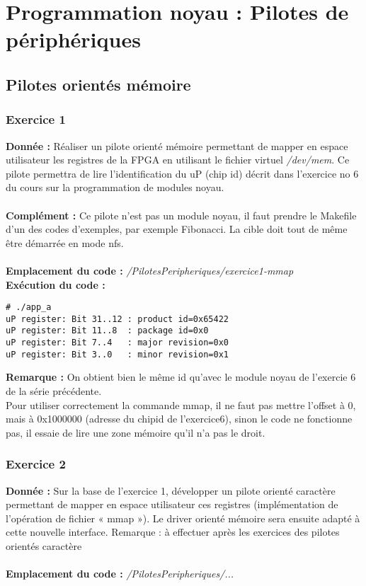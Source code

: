 \section{Programmation noyau : Pilotes de périphériques}
\subsection{Pilotes orientés mémoire}
\subsubsection{Exercice 1}
\textbf{Donnée : } Réaliser	un	pilote	orienté	mémoire	permettant	de	mapper	en	espace	utilisateur	les	registres	de	la	
 FPGA	en	utilisant	le	fichier	virtuel	\textit{/dev/mem}.	Ce	pilote	permettra	de	lire	l’identification	du	uP	
(chip	id)	décrit	dans	l’exercice	no 6 du	cours	sur	la	programmation	de	modules	noyau.\\\\
\textbf{Complément : } Ce pilote n'est pas un module noyau, il faut prendre le Makefile d'un des codes d'exemples, par exemple Fibonacci. La cible doit tout de même être démarrée en mode nfs.\\\\
\textbf{Emplacement du code : } \textit{/PilotesPeripheriques/exercice1-mmap}\\

\textbf{Exécution du code : } \\
\begin{lstlisting}
# ./app_a                                                                       
uP register: Bit 31..12 : product id=0x65422                                    
uP register: Bit 11..8  : package id=0x0                                        
uP register: Bit 7..4   : major revision=0x0                                    
uP register: Bit 3..0   : minor revision=0x1 
\end{lstlisting}

\textbf{Remarque : } On obtient bien le même id qu'avec le module noyau de l'exercie 6 de la série précédente.\\
Pour utiliser correctement la commande mmap, il ne faut pas mettre l'offset à 0, mais à 0x1000000 (adresse du chipid de l'exercice6), sinon le code ne fonctionne pas, il essaie de lire une zone mémoire qu'il n'a pas le droit.

\subsubsection{Exercice 2}
\textbf{Donnée : } Sur	la	base	de	l’exercice	1,	développer	un	pilote	orienté	caractère	permettant	de	mapper	en	
espace	utilisateur	ces registres	(implémentation	de	l’opération	de	fichier	« mmap »).	
Le	driver	orienté	mémoire	sera	ensuite	adapté	à	cette	nouvelle	interface.
Remarque :	à	effectuer	après	les	exercices	des	pilotes	orientés	caractère\\\\
\textbf{Emplacement du code : } \textit{/PilotesPeripheriques/...}\\

